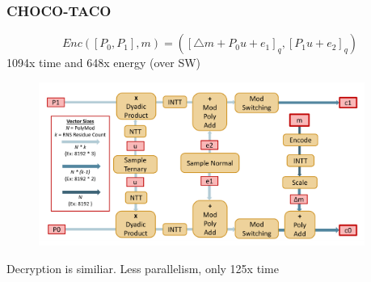 \documentclass[10pt]{beamer}
\begin{document}
\begin{frame}
\frametitle{CHOCO-TACO}

    \vspace{-0.5cm}
\begin{equation*}
    Enc([P_0,P_1],m) = ([\triangle m + P_0u+e_1]_q, [P_1u+e_2]_q)
\end{equation*}
\centering
\pause
    1094x time and 648x energy (over SW)
    \vspace{-0.4cm}
\begin{figure}
    \includegraphics[width=0.95\textwidth]{pipeline.png}
\end{figure}
\centering
    \vspace{-0.5cm}
Decryption is similiar. Less parallelism, only 125x time




\end{frame}
\end{document}
